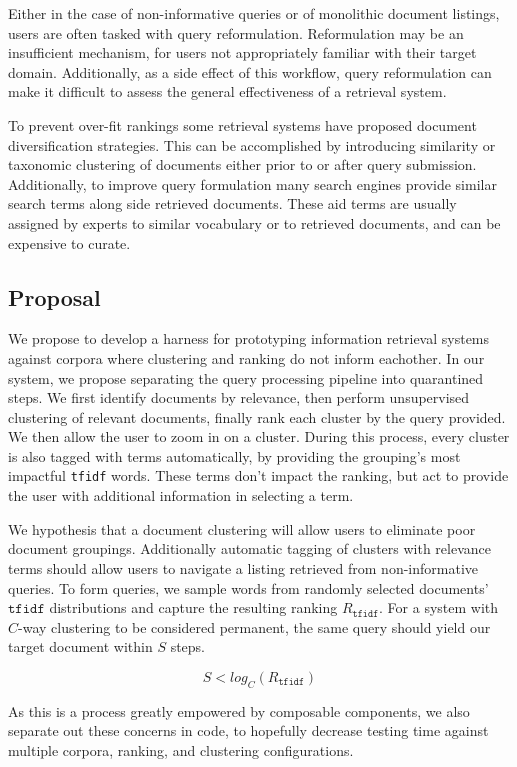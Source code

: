 \documentclass[11pt]{article}
\def\tfidf{\texttt{tfidf}\xspace}
\begin{document}
Either in the case of non-informative queries or of monolithic document listings, users
are often tasked with query reformulation. Reformulation may be an insufficient mechanism,
for users not appropriately familiar with their target domain. Additionally, as
a side effect of this workflow, query reformulation can make it difficult to assess
the general effectiveness of a retrieval system\cite{Huang2009}.

To prevent over-fit rankings some retrieval systems have proposed document diversification
strategies\cite{Zhu2014}. This can be accomplished by introducing similarity or
taxonomic clustering of documents either prior to or after query submission. Additionally,
to improve query formulation many search engines provide similar search terms along side
retrieved documents. These aid terms are usually assigned by experts
to similar vocabulary or to retrieved documents, and can be expensive to curate.

\subsection{Proposal}
We propose to develop a harness for prototyping information retrieval systems against
corpora where clustering and ranking do not inform eachother.
In our system, we propose separating the query processing pipeline into quarantined
steps. We first identify documents by relevance, then perform unsupervised clustering
of relevant documents, finally rank each cluster by the query provided. We then allow
the user to zoom in on a cluster. During this process, every cluster is also tagged with
terms automatically, by providing the grouping's most impactful \tfidf words. These terms
don't impact the ranking, but act to provide the user with additional information in
selecting a term.

We hypothesis that a document clustering will allow users to eliminate poor document
groupings. Additionally automatic tagging of clusters with relevance terms should allow
users to navigate a listing retrieved from non-informative queries. To form queries, we
sample words from randomly selected documents' $\tfidf$ distributions and capture the
resulting ranking $R_\tfidf$. For a system with $C$-way clustering to be considered
permanent, the same query should yield our target document within $S$ steps.

\[S < log_C (R_\tfidf)\]

As this is a process greatly empowered by composable components, we also separate out
these concerns in code, to hopefully decrease testing time against multiple corpora,
ranking, and clustering configurations.
\end{document}
